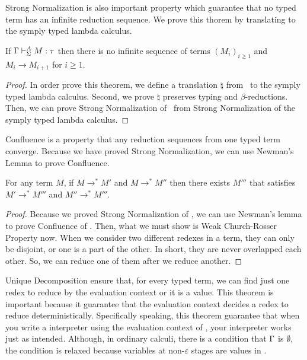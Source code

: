 Strong Normalization is also important property which guarantee that
no typed term has an infinite reduction sequence.
We prove this thorem by translating \LMD to the symply typed lambda calculus.

\begin{theorem}
	If $\Gamma\vdash_\Sigma^A M:\tau$ then there is no infinite sequence of terms $(M_i)_{i\ge1}$ and 
	$M_i \longrightarrow M_{i+1}$ for $i\ge 1$.
\end{theorem}

\begin{proof}
	In order prove this theorem, we define a translation $\natural$ from \LMD\ to the symply typed lambda calculus.
	Second, we prove $\natural$ preserves typing and $\beta$-reductions.
	Then, we can prove Strong Normalization of \LMD\ from Strong Normalization of the symply typed lambda calculus.
\end{proof}

Confluence is a property that any reduction sequences from one typed term converge.
Because we have proved Strong Normalization, we can use Newman's Lemma to prove Confluence.

\begin{theorem}[Confluence]
	For any term $M$, if $M \longrightarrow^* M'$ and $M \longrightarrow^* M''$ then
	there exists $M'''$ that satisfies $M' \longrightarrow^* M'''$ and $M'' \longrightarrow^* M'''$.
\end{theorem}

\begin{proof}
	Because we proved Strong Normalization of \LMD, 
	we can use Newman's lemma to prove Confluence of \LMD.
	Then, what we must show is Weak Church-Rosser Property now.
	When we consider two different redexes in a \LMD term, they can only be disjoint, or one is a part of the other.
	In short, they are never overlapped each other.
	So, we can reduce one of them after we reduce another.
\end{proof}

Unique Decomposition ensure that,
for every typed term, we can find just one redex to reduce by the evaluation context or it is a value.
This theorem is important because it guarantee
that the evaluation context decides a redex to reduce deterministically.
Specifically speaking, this theorem guarantee that 
when you write a interpreter using the evaluation context of \LMD,
your interpreter works just as intended.
Although, in ordinary calculi, there is a condition that $\Gamma$ is $\emptyset$,
the condition is relaxed because variables at non-$\varepsilon$ stages are values in \LMD.

